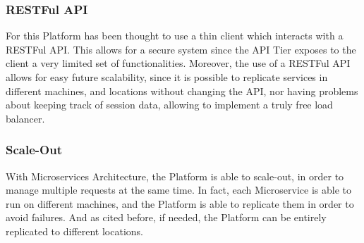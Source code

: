\subsubsection{RESTFul API} \label{parr:restful}
For this Platform has been thought to use a thin client which interacts with a RESTFul API. This allows for a secure system since the API Tier exposes to the client a very limited set of functionalities. 
Moreover, the use of a RESTFul API allows for easy future scalability, since it is possible to replicate services in different machines, and locations without changing the API, nor having problems about keeping track of session data, allowing to implement a truly free load balancer. 

\subsubsection{Scale-Out}
With Microservices Architecture, the Platform is able to scale-out, in order to manage multiple requests at the same time. In fact, each Microservice is able to run on different machines, and the Platform is able to replicate them in order to avoid failures. And as cited before, if needed, the Platform can be entirely replicated to different locations.
